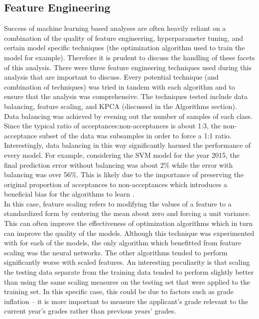 \documentclass[titlepage]{article}
\begin{document}
\subsection{Feature Engineering}
Success of machine learning based analyses are often heavily reliant on a combination of the quality of feature engineering, hyperparameter tuning, and certain model specific techniques (the optimization algorithm used to train the model for example). Therefore it is prudent to discuss the handling of these facets of this analysis. There were three feature engineering techniques used during this analysis that are important to discuss. Every potential technique (and combination of techniques) was tried in tandem with each algorithm and to ensure that the analysis was comprehensive. The techniques tested include data balancing, feature scaling, and KPCA (discussed in the Algorithms section).\\
Data balancing was achieved by evening out the number of samples of each class. Since the typical ratio of acceptances:non-acceptances is about 1:3, the non-acceptance subset of the data was subsamples in order to force a 1:1 ratio. Interestingly, data balancing in this way significantly harmed the performance of every model. For example, considering the SVM model for the year 2015, the final prediction error without balancing was about 2\% while the error with balancing was over 56\%. This is likely due to the importance of preserving the original proportion of acceptances to non-acceptances which introduces a beneficial bias for the algorithms to learn \cite{imbalanceBias}.\\
In this case, feature scaling refers to modifying the values of a feature to a standardized form by centering the mean about zero and forcing a unit variance. This can often improve the effectiveness of optimization algorithms which in turn can improve the quality of the models. Although this technique was experimented with for each of the models, the only algorithm which benefitted from feature scaling was the neural networks. The other algorithms tended to perform significantly worse with scaled features. An interesting peculiarity is that scaling the testing data separate from the training data tended to perform slightly better than using the same scaling measures on the testing set that were applied to the training set. In this specific case, this could be due to factors such as grade inflation -- it is more important to measure the applicant's grade relevant to the current year's grades rather than previous years' grades.\\
\end{document}
